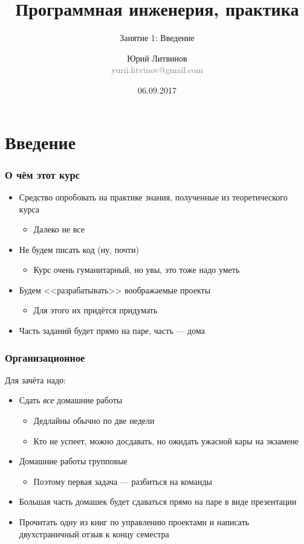 \documentclass[xetex,mathserif,serif]{beamer}
\title{Программная инженерия, практика}
\subtitle{Занятие 1: Введение}
\author[Юрий Литвинов]{Юрий Литвинов\\\small{\textcolor{gray}{yurii.litvinov@gmail.com}}}
\date{06.09.2017}
\begin{document}
	\frame{\titlepage}

	\section{Введение}

	\begin{frame}
		\frametitle{О чём этот курс}
		\begin{itemize}
			\item Средство опробовать на практике знания, полученные из теоретического курса
			\begin{itemize}
				\item Далеко не все
			\end{itemize}
			\item Не будем писать код (ну, почти)
			\begin{itemize}
				\item Курс очень гуманитарный, но увы, это тоже надо уметь
			\end{itemize}
			\item Будем <<разрабатывать>> воображаемые проекты
			\begin{itemize}
				\item Для этого их придётся придумать
			\end{itemize}
			\item Часть заданий будет прямо на паре, часть --- дома
		\end{itemize}
	\end{frame}

	\begin{frame}
		\frametitle{Организационное}
		Для зачёта надо:
		\begin{itemize}
			\item Сдать \emph{все} домашние работы
			\begin{itemize}
				\item Дедлайны обычно по две недели
				\item Кто не успеет, можно досдавать, но ожидать ужасной кары на экзамене
			\end{itemize}
			\item Домашние работы групповые
			\begin{itemize}
				\item Поэтому первая задача --- разбиться на команды
			\end{itemize}
			\item Большая часть домашек будет сдаваться прямо на паре в виде презентации
			\item Прочитать одну из книг по управлению проектами и написать двухстраничный отзыв к концу семестра
		\end{itemize}
	\end{frame}
\end{document}
